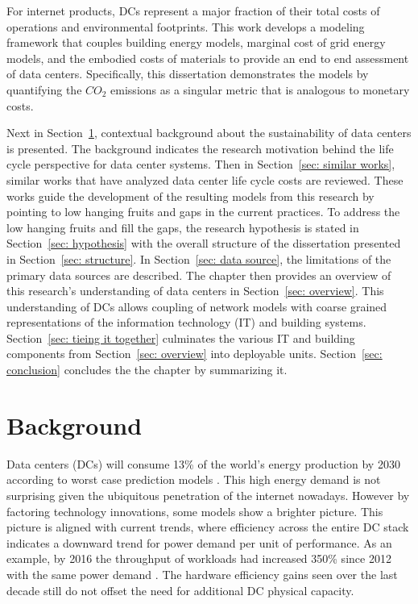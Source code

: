     For internet products, DCs represent a major fraction of their total costs of operations and environmental footprints.  This work develops a modeling framework that couples building energy models, marginal cost of grid energy models, and the embodied costs of materials to provide an end to end assessment of data centers. Specifically, this dissertation demonstrates the models by quantifying the $CO_2$ emissions as a singular metric that is analogous to monetary costs.
    
    Next in Section~\ref{sec: background}, contextual background about the sustainability of data centers is presented. The background indicates the research motivation behind the life cycle perspective for data center systems. Then in Section~\ref{sec: similar works}, similar works that have analyzed data center life cycle costs are reviewed. These works guide the development of the resulting models from this research by pointing to low hanging fruits and gaps in the current practices. To address the low hanging fruits and fill the gaps, the research hypothesis is stated in Section~\ref{sec: hypothesis} with the overall structure of the dissertation presented in Section~\ref{sec: structure}. In Section~\ref{sec: data source}, the limitations of the primary data sources are described. The chapter then provides an overview of this research's understanding of data centers in Section~\ref{sec: overview}. This understanding of DCs allows coupling of network models with coarse grained representations of the information technology (IT) and building systems.  Section~\ref{sec: tieing it together} culminates the various IT and building components from Section~\ref{sec: overview} into deployable units. Section~\ref{sec: conclusion} concludes the the chapter by summarizing it. 

\section{Background}
\label{sec: background}

    Data centers (DCs) will consume 13\% of the world's energy production by 2030 according to worst case prediction models \cite{andrae15}. This high energy demand is not surprising given the ubiquitous penetration of the internet nowadays. However by factoring technology innovations, some models show a brighter picture. This picture is aligned with current trends, where efficiency across the entire DC stack indicates a downward trend for power demand per unit of performance. As an example, by 2016 the throughput of workloads had increased 350\% since 2012 with the same power demand \cite{GoogleEnvRpt}.  The hardware efficiency gains seen over the last decade still do not offset the need for additional DC physical capacity.
    

